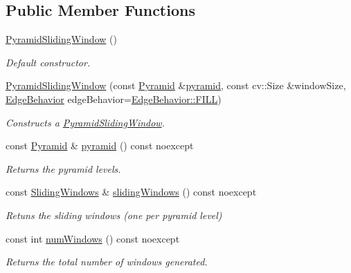 \subsection*{Public Member Functions}
\begin{DoxyCompactItemize}
\item 
\hyperlink{group___imagery_module_ga7081b8742fc33b80063c679df62eda40}{Pyramid\+Sliding\+Window} ()
\begin{DoxyCompactList}\small\item\em Default constructor. \end{DoxyCompactList}\item 
\hyperlink{group___imagery_module_gac631dfe3960fc55db1cd264b508d7927}{Pyramid\+Sliding\+Window} (const \hyperlink{classdg_1_1deepcore_1_1imagery_1_1_pyramid}{Pyramid} \&\hyperlink{group___imagery_module_ga5e94310b058604eb1df583996f97dd14}{pyramid}, const cv\+::\+Size \&window\+Size, \hyperlink{group___imagery_module_gaf813556adc6cfc1daa1ee410d7c84a17}{Edge\+Behavior} edge\+Behavior=\hyperlink{namespacedg_1_1deepcore_1_1imagery_gaf813556adc6cfc1daa1ee410d7c84a17ae8225b11842409df543692aebed34fd1}{Edge\+Behavior\+::\+F\+I\+LL})
\begin{DoxyCompactList}\small\item\em Constructs a \hyperlink{classdg_1_1deepcore_1_1imagery_1_1_pyramid_sliding_window}{Pyramid\+Sliding\+Window}. \end{DoxyCompactList}\item 
const \hyperlink{classdg_1_1deepcore_1_1imagery_1_1_pyramid}{Pyramid} \& \hyperlink{group___imagery_module_ga5e94310b058604eb1df583996f97dd14}{pyramid} () const noexcept
\begin{DoxyCompactList}\small\item\em Returns the pyramid levels. \end{DoxyCompactList}\item 
const \hyperlink{namespacedg_1_1deepcore_1_1imagery_af586b82f51aad0d30be6ee5671df62c5}{Sliding\+Windows} \& \hyperlink{group___imagery_module_gaf36171178d54eeed0b910aede8fd1933}{sliding\+Windows} () const noexcept
\begin{DoxyCompactList}\small\item\em Retuns the sliding windows (one per pyramid level) \end{DoxyCompactList}\item 
const int \hyperlink{group___imagery_module_gaced848a3140b83deb89ba3ba522bdfa9}{num\+Windows} () const noexcept
\begin{DoxyCompactList}\small\item\em Returns the total number of windows generated. \end{DoxyCompactList}\item 

\end{DoxyCompactItemize}
